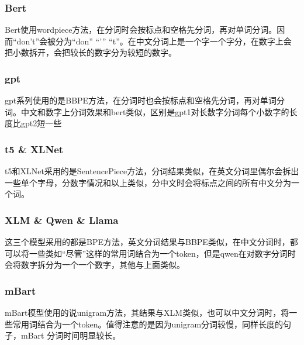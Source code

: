 \documentclass[12pt,letterpaper]{article}
\begin{document}
\subsubsection{Bert}

Bert使用wordpiece方法，在分词时会按标点和空格先分词，再对单词分词。因而“don't”会被分为“don” “'” “t”。在中文分词上是一个字一个字分，在数字上会把小数拆开，会把较长的数字分为较短的数字。

\subsubsection{gpt}

gpt系列使用的是BBPE方法，在分词时也会按标点和空格先分词，再对单词分词。中文和数字上分词效果和bert类似，区别是gpt1对长数字分词每个小数字的长度比gpt2短一些

\subsubsection{t5 \& XLNet}
t5和XLNet采用的是SentencePiece方法，分词结果类似，在英文分词里偶尔会拆出一些单个字母，分数字情况和以上类似，分中文时会将标点之间的所有中文分为一个词。

\subsubsection{XLM \& Qwen \& Llama}

这三个模型采用的都是BPE方法，英文分词结果与BBPE类似，在中文分词时，都可以将一些类如“尽管”这样的常用词结合为一个token，但是qwen在对数字分词时会将数字拆分为一个一个数字，其他与上面类似。

\subsubsection{mBart}

mBart模型使用的说unigram方法，其结果与XLM类似，也可以中文分词时，将一些常用词结合为一个token。值得注意的是因为unigram分词较慢，同样长度的句子，mBart 分词时间明显较长。
\end{document}
